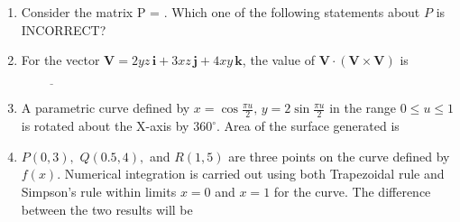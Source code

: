 \documentclass[journal]{IEEEtran}
\begin{document}
\begin{enumerate}[leftmargin=0pt]
    \item Consider the matrix P = . Which one of the following statements about $P$ is INCORRECT?
    \hfill{}
    \begin{enumerate}
    \end{enumerate}

    \item For the vector $\mathbf{V} = 2yz\,\mathbf{i} + 3xz\,\mathbf{j} + 4xy\,\mathbf{k}$, the value of $\mathbf{V} \cdot (\mathbf{V} \times \mathbf{V})$ is $\underline{\hspace{2cm}}$
    \hfill{}

    \item A parametric curve defined by $x = \cos \frac{\pi u}{2},\,y = 2\sin\frac{\pi u}{2}$ in the range $0 \leq u \leq 1$ is rotated about the X-axis by $360^\circ$. Area of the surface generated is
    \hfill{}
    \begin{enumerate}
    \end{enumerate}

    \item $P(0,3),$ $Q(0.5,4),$ and $R(1,5)$ are three points on the curve defined by $f(x)$. Numerical integration is carried out using both Trapezoidal rule and Simpson's rule within limits $x = 0$ and $x = 1$ for the curve. The difference between the two results will be
    \hfill{}
    \begin{enumerate}
    \end{enumerate}


\end{enumerate}
\end{document}
